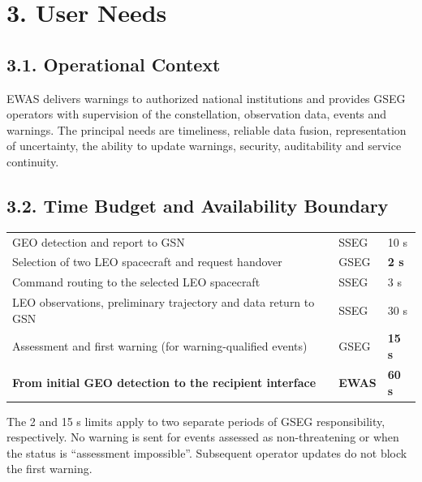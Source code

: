 \section{3. User Needs}\label{user-needs}

\subsection{3.1. Operational Context}\label{operational-context}

EWAS delivers warnings to authorized national institutions and provides GSEG operators with supervision of the constellation, observation data, events and warnings. The principal needs are timeliness, reliable data fusion, representation of uncertainty, the ability to update warnings, security, auditability and service continuity.

\subsection{3.2. Time Budget and Availability Boundary}\label{system-warning-time-budget}

\begingroup{}
\begin{longtable}{|P{0.49}|P{0.28}|P{0.23}|}
\hline{}
 &  & \\ \hline
\endhead
\hline\endlastfoot
GEO detection and report to GSN & SSEG & 10 s\\ \hline
Selection of two LEO spacecraft and request handover & GSEG & \textbf{2 s}\\ \hline
Command routing to the selected LEO spacecraft & SSEG & 3 s\\ \hline
LEO observations, preliminary trajectory and data return to GSN & SSEG & 30 s\\ \hline
Assessment and first warning (for warning-qualified events) & GSEG & \textbf{15 s}\\ \hline
\textbf{From initial GEO detection to the recipient interface} & \textbf{EWAS} & \textbf{60 s}\\*
\end{longtable}
\endgroup

The 2 and 15 s limits apply to two separate periods of GSEG responsibility, respectively. No warning is sent for events assessed as non-threatening or when the status is “assessment impossible”. Subsequent operator updates do not block the first warning.

